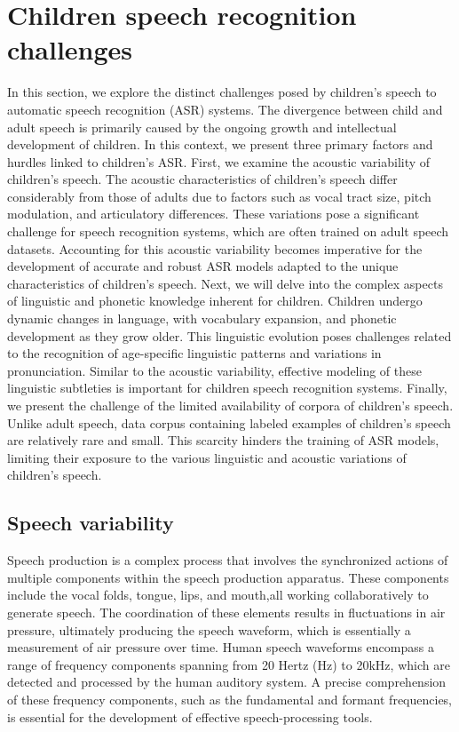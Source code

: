 \section{Children speech  recognition challenges}%
\label{section:Children_seepch_challenges}
In this section, we explore the distinct challenges posed by children's speech to automatic speech recognition (ASR) systems. The divergence between child and adult speech is primarily caused by the ongoing growth and intellectual development of children. In this context, we present three primary factors and hurdles linked to children's ASR. 
First, we examine the acoustic variability of children's speech. The acoustic characteristics of children's speech differ considerably from those of adults due to factors such as vocal tract size, pitch modulation, and articulatory differences. These variations pose a significant challenge for speech recognition systems, which are often trained on adult speech datasets. Accounting for this acoustic variability becomes imperative for the development of accurate and robust ASR models adapted to the unique characteristics of children's speech.
Next, we will delve into the complex aspects of linguistic and phonetic knowledge inherent for children. Children undergo dynamic changes in language, with vocabulary expansion, and phonetic development as they grow older. This linguistic evolution poses challenges related to the recognition of age-specific linguistic patterns and variations in pronunciation. Similar to the acoustic variability, effective modeling of these linguistic subtleties is important for children speech recognition systems.
Finally, we present the challenge of the limited availability of corpora of children's speech. Unlike adult speech, data corpus containing labeled examples of children's speech are relatively rare and small. This scarcity hinders the training of ASR models, limiting their exposure to the various linguistic and acoustic variations of children's speech.

\subsection{Speech variability}%
Speech production is a complex process that involves the synchronized actions of multiple components within the speech production apparatus. These components include the vocal folds, tongue, lips, and mouth,all working collaboratively to generate speech. The coordination of these elements results in fluctuations in air pressure, ultimately producing the speech waveform, which is essentially a measurement of air pressure over time. Human speech waveforms encompass a range of frequency components spanning from 20 Hertz (Hz) to 20kHz, which are detected and processed by the human auditory system. A precise comprehension of these frequency components, such as the fundamental and formant frequencies, is essential for the development of effective speech-processing tools.

